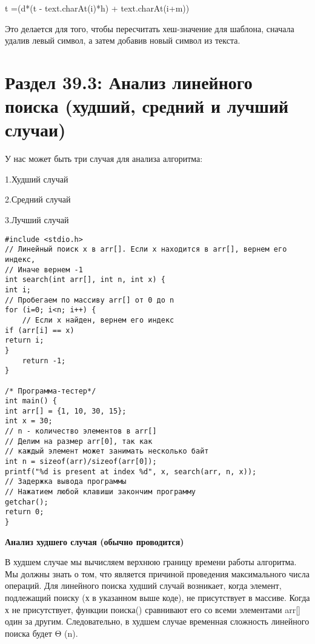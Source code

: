 \vspace{\baselineskip}
t =(d*(t - text.charAt(i)*h) + text.charAt(i+m))%

\vspace{\baselineskip}
Это делается для того, чтобы пересчитать хеш-значение для шаблона, сначала удалив левый символ, а затем добавив новый символ из текста.

\vspace{\baselineskip}
\section*{Раздел 39.3: Анализ линейного поиска (худший, средний и лучший случаи)}

\vspace{\baselineskip}
У нас может быть три случая для анализа алгоритма: 

\vspace{\baselineskip}
1.Худший случай 

\vspace{\baselineskip}
2.Средний случай

\vspace{\baselineskip}
3.Лучший случай

\vspace{\baselineskip}
\begin{verbatim} 
#include <stdio.h>
// Линейный поиск x в arr[]. Если x находится в arr[], вернем его индекс,
// Иначе вернем -1
int search(int arr[], int n, int x) {
int i;
// Пробегаем по массиву arr[] от 0 до n
for (i=0; i<n; i++) {
	// Если x найден, вернем его индекс
if (arr[i] == x)
return i;
}
	return -1;
}

/* Программа-тестер*/
int main() {
int arr[] = {1, 10, 30, 15};
int x = 30;
// n - количество элементов в arr[]
// Делим на размер arr[0], так как
// каждый элемент может занимать несколько байт
int n = sizeof(arr)/sizeof(arr[0]);
printf("%d is present at index %d", x, search(arr, n, x));
// Задержка вывода программы
// Нажатием любой клавиши закончим программу
getchar();
return 0;
}
\end{verbatim}


\newpage

\textbf{Анализ худшего случая (обычно проводится)} 

\vspace{\baselineskip}
В худшем случае мы вычисляем верхнюю границу времени работы алгоритма. Мы должны знать о том, что является причиной проведения максимального числа операций. Для линейного поиска худший случай возникает, когда элемент, подлежащий поиску (х в указанном выше коде), не присутствует в массиве. Когда х не присутствует, функции поиска() сравнивают его со всеми элементами arr[] один за другим. Следовательно, в худшем случае временная сложность линейного поиска будет Θ (n).


